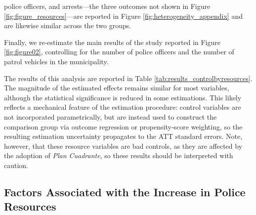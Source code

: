 police officers, and arrests---the three outcomes not shown in Figure \ref{fig:figure_resources}---are reported in Figure \ref{fig:heterogeneity_appendix} and are likewise similar across the two groups.

Finally, we re-estimate the main results of the study reported in Figure \ref{fig:figure02}, controlling for the number of police officers and the number of patrol vehicles in the municipality.

The results of this analysis are reported in Table \ref{tab:results_controlbyresources}. The magnitude of the estimated effects remains similar for most variables, although the statistical significance is reduced in some estimations. This likely reflects a mechanical feature of the \citet{Callaway} estimation procedure: control variables are not incorporated parametrically, but are instead used to construct the comparison group via outcome regression or propensity-score weighting, so the resulting estimation uncertainty propagates to the ATT standard errors. Note, however, that these resource variables are bad controls, as they are affected by the adoption of \emph{Plan Cuadrante}, so these results should be interpreted with caution.




\clearpage

\subsection{Factors Associated with the Increase in Police Resources}
\label{sec:resource_correlates}

